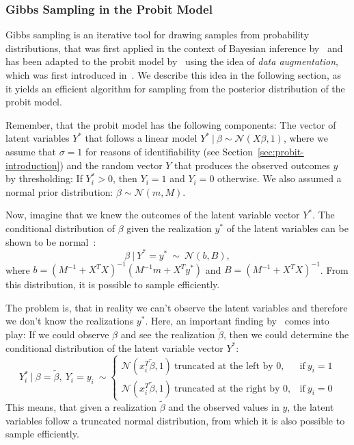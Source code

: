 \subsubsection{Gibbs Sampling in the Probit Model}
\label{sec:gibbs}

Gibbs sampling is an iterative tool for drawing samples from
probability distributions, that was first applied in the
context of Bayesian
inference by~\cite{gibbs-sampler} and has been adapted to the
probit model by~\cite{gibbs-probit-albert-chib} using the idea
of \textit{data augmentation}, which was first introduced
in~\cite{data-augmentation}.
We describe this idea in the following section, as it yields
an efficient algorithm for sampling from the posterior
distribution of the probit model.

Remember, that the probit model has the following components: The vector of latent
variables $Y^\ast$ that follows a linear model
$Y^\ast\ |\ \beta\sim \mathcal{N}(X \beta, 1)$, where we assume that $\sigma=1$
for reasons of identifiability (see Section~\ref{sec:probit-introduction})
and the random vector $Y$ that produces the observed outcomes $y$ by
thresholding: If $Y_i^\ast > 0$, then $Y_i=1$ and $Y_i=0$ otherwise.
We also assumed a normal prior distribution:
$\beta \sim \mathcal{N}(m, M)$.

Now, imagine that we knew the outcomes of the latent variable vector $Y^\ast$.
The conditional distribution of $\beta$ given the realization $y^\ast$
of the latent variables can be shown to be normal~\cite{gibbs-probit-albert-chib}:
\begin{equation}
    \label{eq:gibbs-normal}
    \beta\ |\ Y^\ast = y^\ast\ \sim\ \mathcal{N}(b, B),
\end{equation}
where
$b = (M^{-1} + X^TX)^{-1}(M^{-1} m + X^T y^\ast)$
and
$B = (M^{-1} + X^TX)^{-1}$.
From this distribution, it is possible to sample efficiently.

The problem is, that in reality we can't observe the latent variables and
therefore we don't know the realizations $y^\ast$.
Here, an important finding by~\cite{gibbs-probit-albert-chib} comes
into play: If we could observe $\beta$ and see the realization
$\tilde\beta$, then we could determine the conditional distribution
of the latent variable vector $Y^\ast$:
\begin{equation}
    \label{eq:truncated-normal}
    Y_i^\ast\ |\ \beta = \tilde\beta,\ Y_i=y_i\ \sim
    \begin{cases}
        \mathcal{N}(x_i^T\tilde\beta, 1)\ \text{truncated at the left by 0},  & \text{if}\ y_i = 1 \\
        \mathcal{N}(x_i^T\tilde\beta, 1)\ \text{truncated at the right by 0}, & \text{if}\ y_i = 0
    \end{cases}
\end{equation}
This means, that given a realization $\tilde\beta$ and the observed
values in $y$, the latent variables
follow a truncated normal distribution, from which it is also
possible to sample efficiently.

